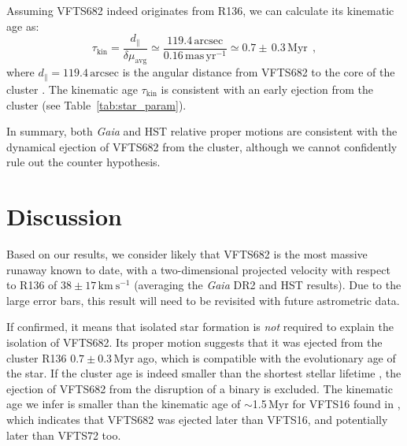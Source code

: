 \documentclass[a4paper,fleqn,usenatbib]{mnras}
\newcommand{\kms}{{\,\mathrm{km\ s^{-1}}}}
\newcommand{\masyr}{\,\mathrm{mas}\,\mathrm{yr}^{-1}}
\DeclareRobustCommand{\Tabref}[1]{Table~\ref{#1}}
\begin{document}
Assuming VFTS682 indeed originates from R136, we can calculate its kinematic
age as:
\begin{equation}
  \label{eq:kin_age}
  \tau_\mathrm{kin} = \frac{d_\parallel}{\delta\mu_\mathrm{avg}} \simeq
  \frac{119.4\,\mathrm{arcsec}}{0.16\masyr} \simeq 0.7\pm\,0.3\, \mathrm{Myr} \ \ ,
\end{equation}
where $d_\parallel = 119.4\,\mathrm{arcsec}$ is the angular distance from VFTS682 to
the core of the cluster \citep[][]{bestenlehner:11}. %
The kinematic age $\tau_\mathrm{kin}$ is consistent with an early
ejection from the cluster (see \Tabref{tab:star_param}).

In summary, both \emph{Gaia} and HST relative proper motions are consistent with the dynamical ejection of
VFTS682 from the cluster, although we cannot confidently rule out the
counter hypothesis. 

\section{Discussion}
\label{sec:discussion}

Based on our results, we consider likely that VFTS682 is the most massive
runaway known to date, with a two-dimensional
projected velocity with respect to R136 of
$38\pm17\kms$ (averaging the \emph{Gaia} DR2 and HST
results). Due to the large error bars, this result will need
to be revisited with future astrometric data. %

If confirmed, it means that isolated star formation is
\emph{not} required to explain the isolation of VFTS682. Its proper motion suggests that it was ejected from the cluster R136
$0.7\pm0.3$\,Myr ago, which is compatible with the evolutionary age of
the star. If the
cluster age \citep[$\lesssim2$\,Myr,][]{crowther:10, sabbi:12} is
indeed smaller than the shortest stellar lifetime
\citep[$\sim$3\,Myr,][]{brott:11,kohler:15, zapartas:17}, the ejection of VFTS682
from the disruption of a binary is excluded. %
The kinematic age we infer is smaller than the kinematic age of
$\sim$1.5\,Myr for VFTS16 found in \cite{lennon:18}, which indicates
that VFTS682 was ejected later than VFTS16, and potentially later than
VFTS72 too.
\end{document}
